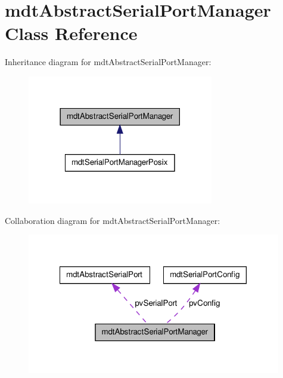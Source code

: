 \hypertarget{classmdt_abstract_serial_port_manager}{
\section{mdtAbstractSerialPortManager Class Reference}
\label{classmdt_abstract_serial_port_manager}
}


Inheritance diagram for mdtAbstractSerialPortManager:\nopagebreak
\begin{figure}[H]
\begin{center}
\leavevmode
\includegraphics[width=230pt]{classmdt_abstract_serial_port_manager__inherit__graph}
\end{center}
\end{figure}


Collaboration diagram for mdtAbstractSerialPortManager:\nopagebreak
\begin{figure}[H]
\begin{center}
\leavevmode
\includegraphics[width=314pt]{classmdt_abstract_serial_port_manager__coll__graph}
\end{center}
\end{figure}
